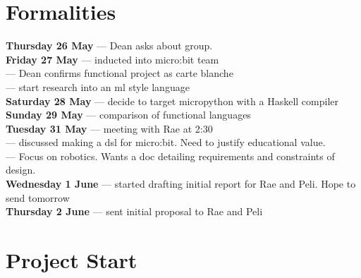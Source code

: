 \section{Formalities} 

\textbf{Thursday 26 May}  --- Dean asks about group.  \\
\textbf{Friday 27 May}  --- inducted into micro:bit team \\
               --- Dean confirms functional project as carte blanche \\
--- start research into an ml style language \\
\textbf{Saturday 28 May}  --- decide to target micropython with a Haskell compiler \\
\textbf{Sunday 29 May}  --- comparison of functional languages \\
\textbf{Tuesday 31 May}  --- meeting with Rae at 2:30 \\
\textbf{}  --- discussed making a dsl for micro:bit. Need to justify educational value. \\
\textbf{}  --- Focus on robotics. Wants a doc detailing requirements and constraints of design. \\
\textbf{Wednesday 1 June}  --- started drafting initial report for Rae and Peli. Hope to send tomorrow \\
\textbf{Thursday 2 June}  --- sent initial proposal to Rae and Peli \\

\section{Project Start} 

